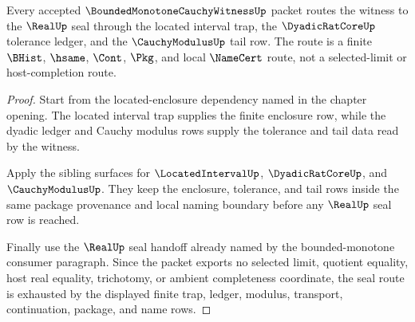 \begin{theorem}
\label{thm:bounded-monotone-cauchy-witness-root-located-real-seal-route}
Every accepted $\BoundedMonotoneCauchyWitnessUp$ packet routes the witness to the $\RealUp$ seal through the located interval trap, the $\DyadicRatCoreUp$ tolerance ledger, and the $\CauchyModulusUp$ tail row. The route is a finite $\BHist$, $\hsame$, $\Cont$, $\Pkg$, and local $\NameCert$ route, not a selected-limit or host-completion route.
\end{theorem}
\begin{proof}
Start from the located-enclosure dependency named in the chapter opening. The located interval trap supplies the finite enclosure row, while the dyadic ledger and Cauchy modulus rows supply the tolerance and tail data read by the witness.

Apply the sibling surfaces for $\LocatedIntervalUp$, $\DyadicRatCoreUp$, and $\CauchyModulusUp$. They keep the enclosure, tolerance, and tail rows inside the same package provenance and local naming boundary before any $\RealUp$ seal row is reached.

Finally use the $\RealUp$ seal handoff already named by the bounded-monotone consumer paragraph. Since the packet exports no selected limit, quotient equality, host real equality, trichotomy, or ambient completeness coordinate, the seal route is exhausted by the displayed finite trap, ledger, modulus, transport, continuation, package, and name rows.
\end{proof}


